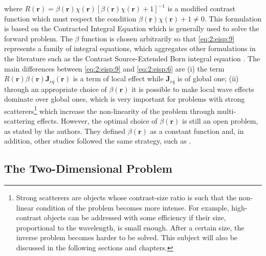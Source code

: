 			\noindent where $R(\mathbf{r}) = \beta(\mathbf{r})\chi(\mathbf{r})\left[\beta(\mathbf{r})\chi(\mathbf{r})+1\right]^{-1}$ is a modified contrast function which must respect the condition $\beta(\mathbf{r})\chi(\mathbf{r})+1 \neq 0$. This formulation is based on the Contracted Integral Equation \citep{pankratov95electromagneticfield,hursan2002contraction} which is generally used to solve the forward problem. The $\beta$ function is chosen arbitrarily so that \eqref{eq:2:eisp:9} represents a family of integral equations, which aggregates other formulations in the literature such as the Contrast Source-Extended Born integral equation \citep{isernia2004new,catapano2007effect,durso2010solution}. The main differences between \eqref{eq:2:eisp:9} and \eqref{eq:2:eisp:6} are (i) the term $R(\mathbf{r})\beta(\mathbf{r})\mathbf{J}_{eq}(\mathbf{r})$ is a term of local effect while $\mathbf{J}_{eq}$ is of global one; (ii) through an appropriate choice of $\beta(\mathbf{r})$ it is possible to make local wave effects dominate over global ones, which is very important for problems with strong scatterers\footnote{Strong scatterers are objects whose contrast-size ratio is such that the non-linear condition of the problem becomes more intense. For example, high-contrast objects can be addressed with some efficiency if their size, proportional to the wavelength, is small enough. After a certain size, the inverse problem becomes harder to be solved. This subject will also be discussed in the following sections and chapters.} which increase the non-linearity of the problem through multi-scattering effects. However, the optimal choice of $\beta(\mathbf{r})$ is still an open problem, as stated by the authors. They defined $\beta(\mathbf{r})$ as a constant function and, in addition, other studies followed the same strategy, such as \citep{zhong2020multiresolution}.
		 	
		\subsection{The Two-Dimensional Problem}\label{chap:problemstatement:eisp:2}
	
